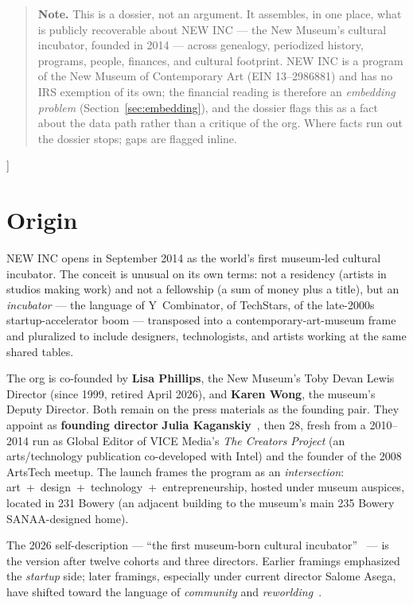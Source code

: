 \documentclass[10pt,letterpaper,twocolumn]{article}
\begin{document}
{\begin{quote}
\small\noindent\textbf{Note.} This is a dossier, not an argument. It assembles, in one place, what is publicly recoverable about NEW INC --- the New Museum's cultural incubator, founded in 2014 --- across genealogy, periodized history, programs, people, finances, and cultural footprint. NEW INC is a program of the New Museum of Contemporary Art (EIN 13--2986881) and has no IRS exemption of its own; the financial reading is therefore an \emph{embedding problem} (Section~\ref{sec:embedding}), and the dossier flags this as a fact about the data path rather than a critique of the org. Where facts run out the dossier stops; gaps are flagged inline.
\end{quote}
\vspace{0.5em}
}]

\section{Origin}

NEW INC opens in September 2014 as the world's first museum-led cultural incubator. The conceit is unusual on its own terms: not a residency (artists in studios making work) and not a fellowship (a sum of money plus a title), but an \emph{incubator} --- the language of Y~Combinator, of TechStars, of the late-2000s startup-accelerator boom --- transposed into a contemporary-art-museum frame and pluralized to include designers, technologists, and artists working at the same shared tables.

The org is co-founded by \textbf{Lisa Phillips}, the New Museum's Toby Devan Lewis Director (since 1999, retired April 2026), and \textbf{Karen Wong}, the museum's Deputy Director. Both remain on the press materials as the founding pair. They appoint as \textbf{founding director} \textbf{Julia Kaganskiy}~\citep{wikipedia2026kaganskiy}, then 28, fresh from a 2010--2014 run as Global Editor of VICE Media's \emph{The Creators Project} (an arts/technology publication co-developed with Intel) and the founder of the 2008 ArtsTech meetup. The launch frames the program as an \emph{intersection}: art~+~design~+~technology~+~entrepreneurship, hosted under museum auspices, located in 231 Bowery (an adjacent building to the museum's main 235 Bowery SANAA-designed home).

The 2026 self-description --- ``the first museum-born cultural incubator''~\citep{newinc2026site} --- is the version after twelve cohorts and three directors. Earlier framings emphasized the \emph{startup} side; later framings, especially under current director Salome Asega, have shifted toward the language of \emph{community} and \emph{reworlding}~\citep{culturedmag2024asega}.
\end{document}

